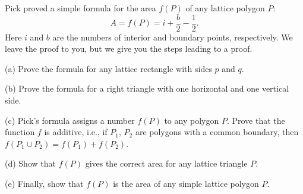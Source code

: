 Pick proved a simple formula for the area $f(P)$ of any lattice polygon $P$:
\[ A = f(P) = i + \frac{b}{2} - \frac{1}{2}. \]
Here $i$ and $b$ are the numbers of interior and boundary points, respectively. We leave the proof to you, but we give you the steps leading to a proof.

(a) Prove the formula for any lattice rectangle with sides $p$ and $q$.

(b) Prove the formula for a right triangle with one horizontal and one vertical side.

(c) Pick's formula assigns a number $f(P)$ to any polygon $P$. Prove that the function $f$ is additive, i.e., if $P_1$, $P_2$ are polygons with a common boundary, then $f(P_1 \cup P_2) = f(P_1) + f(P_2)$.

(d) Show that $f(P)$ gives the correct area for any lattice triangle $P$.

(e) Finally, show that $f(P)$ is the area of any simple lattice polygon $P$.
